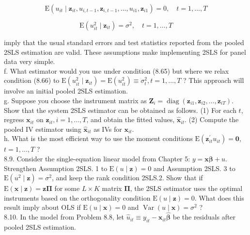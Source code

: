 \documentclass[10pt]{article}
\begin{document}
\begin{equation*}
\mathrm{E}\left(u_{i t} \mid \mathbf{z}_{i t}, u_{i, t-1}, \mathbf{z}_{i, t-1}, \ldots, u_{i 1}, \mathbf{z}_{i 1}\right)=0, \quad t=1, \ldots, T \tag{8.65}
\end{equation*}



\begin{equation*}
\mathrm{E}\left(u_{i t}^{2} \mid \mathbf{z}_{i t}\right)=\sigma^{2}, \quad t=1, \ldots, T \tag{8.66}
\end{equation*}


imply that the usual standard errors and test statistics reported from the pooled 2SLS estimation are valid. These assumptions make implementing 2SLS for panel data very simple.\\
f. What estimator would you use under condition (8.65) but where we relax condition (8.66) to $\mathrm{E}\left(u_{i t}^{2} \mid \mathbf{z}_{i t}\right)=\mathrm{E}\left(u_{i t}^{2}\right) \equiv \sigma_{t}^{2}, t=1, \ldots, T$ ? This approach will involve an initial pooled 2SLS estimation.\\
g. Suppose you choose the instrument matrix as $\mathbf{Z}_{i}=\operatorname{diag}\left(\mathbf{z}_{i 1}, \mathbf{z}_{i 2}, \ldots, \mathbf{z}_{i T}\right)$. Show that the system 2SLS estimator can be obtained as follows. (1) For each $t$, regress $\mathbf{x}_{i t}$ on $\mathbf{z}_{i t}, i=1, \ldots, T$, and obtain the fitted values, $\hat{\mathbf{x}}_{i t}$. (2) Compute the pooled IV estimator using $\hat{\mathbf{x}}_{i t}$ as IVs for $\mathbf{x}_{i t}$.\\
h. What is the most efficient way to use the moment conditions $\mathrm{E}\left(\mathbf{z}_{i t}^{\prime} u_{i t}\right)=\mathbf{0}$, $t=1, \ldots, T$ ?\\
8.9. Consider the single-equation linear model from Chapter 5: $y=\mathbf{x} \boldsymbol{\beta}+u$. Strengthen Assumption 2SLS. 1 to $\mathrm{E}(u \mid \mathbf{z})=0$ and Assumption 2SLS. 3 to $\mathrm{E}\left(u^{2} \mid \mathbf{z}\right)= \sigma^{2}$, and keep the rank condition 2SLS.2. Show that if $\mathrm{E}(\mathbf{x} \mid \mathbf{z})=\mathbf{z} \boldsymbol{\Pi}$ for some $L \times K$ matrix $\boldsymbol{\Pi}$, the 2SLS estimator uses the optimal instruments based on the orthogonality condition $\mathrm{E}(u \mid \mathbf{z})=0$. What does this result imply about OLS if $\mathrm{E}(u \mid \mathbf{x})=0$ and $\operatorname{Var}(u \mid \mathbf{x})=\sigma^{2}$ ?\\
8.10. In the model from Problem 8.8, let $\hat{u}_{i t} \equiv y_{i t}-\mathbf{x}_{i t} \hat{\boldsymbol{\beta}}$ be the residuals after pooled 2SLS estimation.\\
\end{document}
